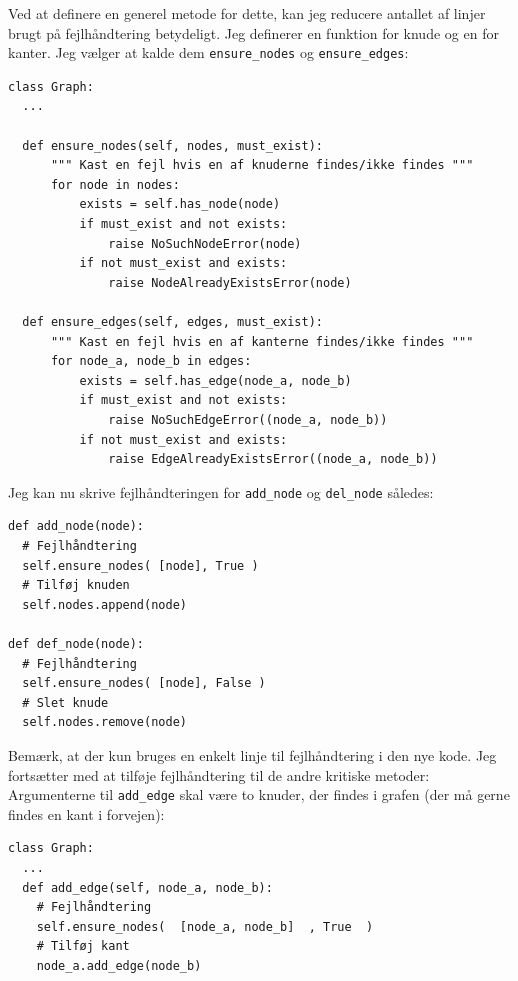 \documentclass[10pt,a4paper,danish]{article}
\newcommand{\ct}{\texttt}
\begin{document}
Ved at definere en generel metode for dette, kan jeg reducere antallet
af linjer brugt på fejlhåndtering betydeligt. Jeg definerer en
funktion for knude og en for kanter. Jeg vælger at kalde dem
\ct{ensure\_nodes} og \ct{ensure\_edges}:

\begin{samepage}
{\small
\begin{verbatim}
class Graph:
  ...

  def ensure_nodes(self, nodes, must_exist):
      """ Kast en fejl hvis en af knuderne findes/ikke findes """
      for node in nodes:
          exists = self.has_node(node)
          if must_exist and not exists:
              raise NoSuchNodeError(node)
          if not must_exist and exists:
              raise NodeAlreadyExistsError(node)

  def ensure_edges(self, edges, must_exist):
      """ Kast en fejl hvis en af kanterne findes/ikke findes """
      for node_a, node_b in edges:
          exists = self.has_edge(node_a, node_b)
          if must_exist and not exists:
              raise NoSuchEdgeError((node_a, node_b))
          if not must_exist and exists:
              raise EdgeAlreadyExistsError((node_a, node_b))
\end{verbatim}}
\end{samepage}


Jeg kan nu skrive fejlhåndteringen for \ct{add\_node} og \ct{del\_node}
således:

{\small
\begin{verbatim}
def add_node(node):
  # Fejlhåndtering
  self.ensure_nodes( [node], True )
  # Tilføj knuden
  self.nodes.append(node)

def def_node(node):
  # Fejlhåndtering
  self.ensure_nodes( [node], False )
  # Slet knude
  self.nodes.remove(node)
\end{verbatim}}

Bemærk, at der kun bruges en enkelt linje til fejlhåndtering i den nye
kode. Jeg fortsætter med at tilføje fejlhåndtering til de andre
kritiske metoder: \\

Argumenterne til \ct{add\_edge} skal være to knuder, der findes i
grafen (der må gerne findes en kant i forvejen):
{\small
\begin{verbatim}
class Graph:
  ...
  def add_edge(self, node_a, node_b):
    # Fejlhåndtering
    self.ensure_nodes(  [node_a, node_b]  , True  )
    # Tilføj kant
    node_a.add_edge(node_b)
\end{verbatim}}
\end{document}
